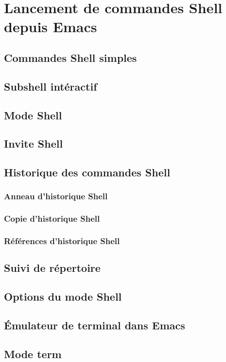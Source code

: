 \section{Lancement de commandes Shell depuis  Emacs} 
\subsection{Commandes Shell simples}
\subsection{Subshell intéractif}
\subsection{Mode Shell}
\subsection{Invite Shell}
\subsection{Historique des commandes Shell}
\subsubsection{Anneau d'historique Shell}
\subsubsection{Copie d'historique Shell}
\subsubsection{Références d'historique Shell}
\subsection{Suivi de répertoire}
\subsection{Options du mode Shell}
\subsection{\'Emulateur de terminal dans Emacs}
\subsection{Mode term}
